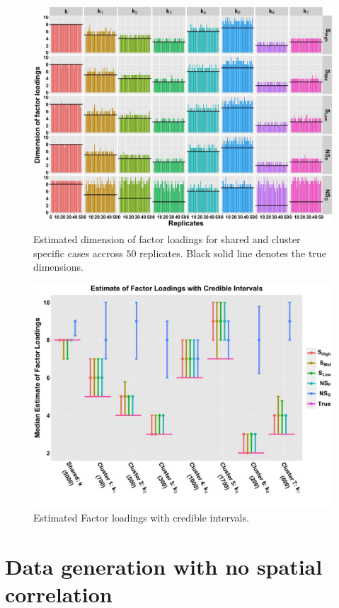 \documentclass[
]{book}
\begin{document}
\begin{figure}

{\centering \includegraphics[width=0.8\linewidth]{images/Loading_Dimension_plot} 

}

\caption{Estimated dimension of factor loadings for shared and cluster specific cases accross $50$ replicates. Black solid line denotes the true dimensions.}\label{fig:factor1}
\end{figure}

\begin{figure}

{\centering \includegraphics[width=0.8\linewidth]{images/Median_Loading_plot} 

}

\caption{Estimated Factor loadings with credible intervals.}\label{fig:factor2}
\end{figure}

\hypertarget{data-generation-with-no-spatial-correlation}{%
\section{Data generation with no spatial correlation}\label{data-generation-with-no-spatial-correlation}}
\end{document}

